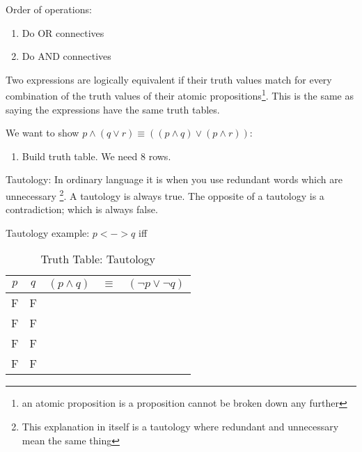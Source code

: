 
Order of operations:

\begin{enumerate}
  \item Do OR connectives
  \item Do AND connectives
\end{enumerate}


Two expressions are logically equivalent if their truth values match for every
combination of the truth values of their atomic propositions\footnote{an atomic
proposition is a proposition cannot be broken down any further}. This is the
same as saying the expressions have the same truth tables.

We want to show $p \land (q \lor r) \equiv ( (p \land q) \lor (p \land r) )$:
\begin{enumerate}
  \item Build truth table. We need 8 rows.
\end{enumerate}

Tautology: In ordinary language it is when you use redundant words which are
unnecessary \footnote{This explanation in itself is a tautology where redundant
and unnecessary mean the same thing}. A tautology is always true. The opposite
of a tautology is a contradiction; which is always false.

Tautology example: $p <-> q $ iff 

\begin{table}[!htb]
\label{tab:TruthTableTautology}
\begin{tabularx}{\linewidth}{| c | c | c | c | X |} \hline
  $p$ & $q$ & $(p \land q) $ & $ \equiv $ & $ (\lnot p \lor \lnot q) $
                                                      \\ \hline \hline
   F  &  F  &               &       &                 \\ \hline
   F  &  F  &               &       &                 \\ \hline
   F  &  F  &               &       &                 \\ \hline
   F  &  F  &               &       &                 \\ \hline
\end{tabularx}
\caption{Truth Table: Tautology}
\end{table}

